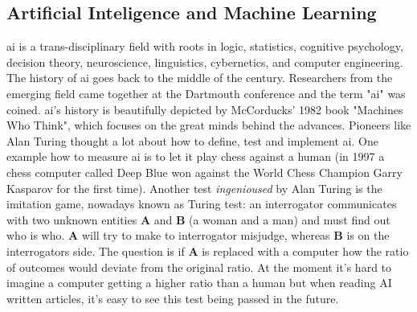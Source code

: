 \subsection{Artificial Inteligence and Machine Learning}
\Gls{ai} is a trans-disciplinary field with roots in logic, statistics, cognitive psychology, decision theory, neuroscience, linguistics, cybernetics, and computer engineering\cite{howard2019artificial}.
The history of \gls{ai} goes back to the middle of the  century. 
Researchers from the emerging field came together at the Dartmouth conference and the term "\gls{ai}" was coined\cite{McCarthy1955}. 
\Gls{ai}'s  history is beautifully depicted by McCorducks' 1982 book "Machines Who Think"\cite{McCorduck1982,Apter1982}, which focuses on the great minds behind the advances.
Pioneers like Alan Turing thought a lot about how to define, test and implement \gls{ai}\cite{howard2019artificial}. 
One example how to measure \gls{ai} is to let it play chess against a human\cite{Silver2017} 
(in 1997 a chess computer called Deep Blue won against the World Chess Champion Garry Kasparov for the first time\cite{Feng1999}).
Another test \textit{ingenioused} by Alan Turing is the imitation game\cite{turing1950imitation}, nowadays known as Turing test:
an interrogator communicates with two unknown entities \textbf{A} and \textbf{B} (a woman and a man) and must find out who is who. 
\textbf{A} will try to make to interrogator misjudge, whereas \textbf{B} is on the interrogators side.
The question is if \textbf{A} is replaced with a computer how the ratio of outcomes would deviate from the original ratio. 
%
At the moment it's hard to imagine a computer getting a higher ratio than a human
but when reading AI written articles\cite{gpt2020}, it's easy to see this test being passed in the future.

